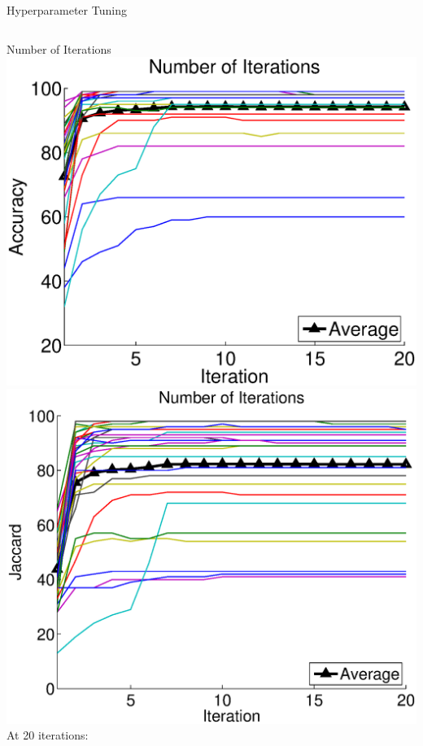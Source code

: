 \documentclass[compress,aspectratio=43]{beamer}
\begin{document}
\begin{frame}{Hyperparameter Tuning}
\begin{columns}[t]
\centering
{\scriptsize Number of Iterations}\\ \vspace{2mm}
\includegraphics[width=1\linewidth]{figures/hyperparameter_tuning/iterations/accuracy.eps}\\
\includegraphics[width=1\linewidth]{figures/hyperparameter_tuning/iterations/jaccard.eps}\\
{\tiny
At 20 iterations:\\
}
\end{columns}
\end{frame}
\end{document}
